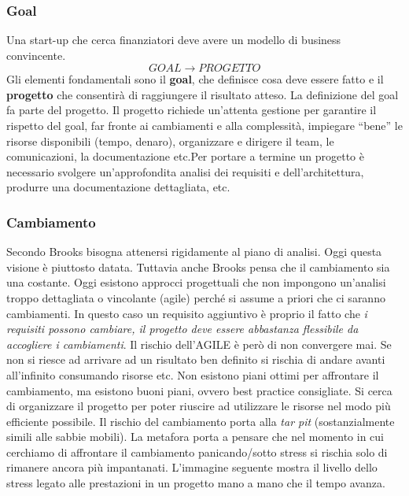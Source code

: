 \subsubsection{Goal}
Una start-up che cerca finanziatori deve avere un modello di business convincente.
$$ GOAL \xrightarrow{} PROGETTO $$
Gli elementi fondamentali sono il \textbf{goal}, che definisce cosa deve essere fatto e il \textbf{progetto} che consentirà  di raggiungere il risultato atteso. La definizione del goal fa parte del progetto.\newline
Il progetto richiede un’attenta gestione per garantire il rispetto del goal, far fronte ai cambiamenti e alla complessità, impiegare “bene” le risorse disponibili (tempo, denaro), organizzare e dirigere il team, le comunicazioni, la documentazione etc.\newline Per portare a termine un progetto è necessario svolgere un’approfondita analisi dei requisiti e dell’architettura, produrre una documentazione dettagliata, etc.
\subsubsection{Cambiamento}
Secondo Brooks bisogna attenersi rigidamente al piano di analisi. Oggi questa visione è piuttosto datata. Tuttavia anche Brooks pensa che il cambiamento sia una costante. Oggi esistono approcci progettuali che non impongono un'analisi troppo dettagliata o vincolante (agile) perché si assume a priori che ci saranno cambiamenti. In questo caso un requisito aggiuntivo è proprio il fatto che \textit{i requisiti possono cambiare, il progetto deve essere abbastanza flessibile da accogliere i cambiamenti}. Il rischio dell'AGILE è però di non convergere mai. Se non si riesce ad arrivare ad un risultato ben definito si rischia di andare avanti all'infinito consumando risorse etc.\newline
Non esistono piani ottimi per affrontare il cambiamento, ma esistono buoni piani, ovvero best practice consigliate. Si cerca di organizzare il progetto per poter riuscire ad utilizzare le risorse nel modo più efficiente possibile.\newline
Il rischio del cambiamento porta alla \textit{tar pit} (sostanzialmente simili alle sabbie mobili). La metafora porta a pensare che nel momento in cui cerchiamo di affrontare il cambiamento panicando/sotto stress si rischia solo di rimanere ancora più impantanati.\newline
L'immagine seguente mostra il livello dello stress legato alle prestazioni in un progetto mano a mano che il tempo avanza.

